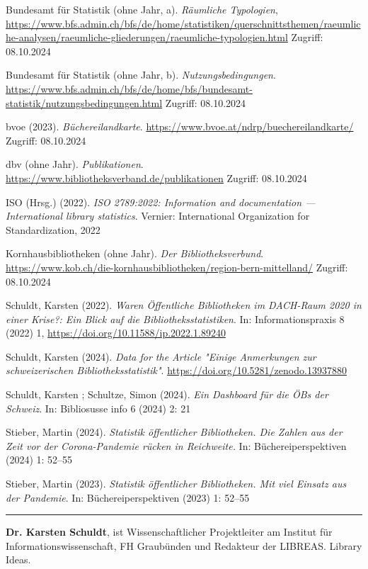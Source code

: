 \documentclass[a4paper,
fontsize=11pt,
oneside,
numbers=noperiodatend,
parskip=half-,
bibliography=totoc,
final
]{scrartcl}
\begin{document}
Bundesamt für Statistik (ohne Jahr, a). \emph{Räumliche Typologien},
\url{https://www.bfs.admin.ch/bfs/de/home/statistiken/querschnittsthemen/raeumliche-analysen/raeumliche-gliederungen/raeumliche-typologien.html}
Zugriff: 08.10.2024

Bundesamt für Statistik (ohne Jahr, b). \emph{Nutzungsbedingungen}.
\url{https://www.bfs.admin.ch/bfs/de/home/bfs/bundesamt-statistik/nutzungsbedingungen.html}
Zugriff: 08.10.2024

bvoe (2023). \emph{Büchereilandkarte}.
\url{https://www.bvoe.at/ndrp/buechereilandkarte/} Zugriff: 08.10.2024

dbv (ohne Jahr). \emph{Publikationen}.
\url{https://www.bibliotheksverband.de/publikationen} Zugriff:
08.10.2024

ISO (Hrsg.) (2022). \emph{ISO 2789:2022: Information and documentation
--- International library statistics}. Vernier: International
Organization for Standardization, 2022

Kornhausbibliotheken (ohne Jahr). \emph{Der Bibliotheksverbund}.
\url{https://www.kob.ch/die-kornhausbibliotheken/region-bern-mittelland/}
Zugriff: 08.10.2024

Schuldt, Karsten (2022). \emph{Waren Öffentliche Bibliotheken im
DACH-Raum 2020 in einer Krise?: Ein Blick auf die
Bibliotheksstatistiken}. In: Informationspraxis 8 (2022) 1,
\url{https://doi.org/10.11588/ip.2022.1.89240}

Schuldt, Karsten (2024). \emph{Data for the Article "Einige Anmerkungen
zur schweizerischen Bibliotheksstatistik"}.
\url{https://doi.org/10.5281/zenodo.13937880}

Schuldt, Karsten ; Schultze, Simon (2024). \emph{Ein Dashboard für die
ÖBs der Schweiz}. In: Bibliosusse info 6 (2024) 2: 21

Stieber, Martin (2024). \emph{Statistik öffentlicher Bibliotheken. Die
Zahlen aus der Zeit vor der Corona-Pandemie rücken in Reichweite.} In:
Büchereiperspektiven (2024) 1: 52--55

Stieber, Martin (2023). \emph{Statistik öffentlicher Bibliotheken. Mit
viel Einsatz aus der Pandemie}. In: Büchereiperspektiven (2023) 1:
52--55

\begin{center}\rule{0.5\linewidth}{0.5pt}\end{center}

\textbf{Dr. Karsten Schuldt}, ist Wissenschaftlicher Projektleiter am
Institut für Informationswissenschaft, FH Graubünden und Redakteur der
LIBREAS. Library Ideas.
\end{document}
